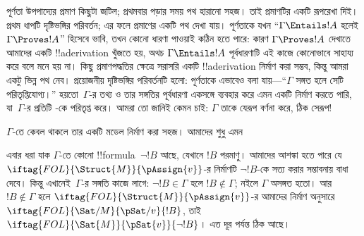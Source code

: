 \documentclass[../../../include/open-logic-section]{subfiles}
\begin{document}
      {}
      {}


পূর্ণতা উপপাদ্যের প্রমাণ কিছুটা জটিল; প্রথমবার পড়ার সময় পথ হারানো সহজ।
তাই প্রমাণটির একটি রূপরেখা দিই। প্রথম ধাপটি দৃষ্টিভঙ্গির পরিবর্তন; এর ফলে
প্রমাণের একটি পথ দেখা যায়। পূর্ণতাকে যখন “$\Gamma \Entails !A$ হলেই
$\Gamma \Proves !A$” হিসেবে ভাবি, তখন কোনো ধারণা পাওয়াই কঠিন হতে পারে:
কারণ $\Gamma \Proves !A$ দেখাতে আমাদের একটি !!a{derivation} খুঁজতে হয়,
অথচ $\Gamma \Entails !A$ পূর্বধারণাটি এই কাজে কোনোভাবে সাহায্য করে বলে
মনে হয় না। কিছু প্রমাণপদ্ধতির ক্ষেত্রে সরাসরি একটি !!a{derivation}
নির্মাণ করা সম্ভব, কিন্তু আমরা একটু ভিন্ন পথ নেব। প্রয়োজনীয় দৃষ্টিভঙ্গির
পরিবর্তনটি হলো: পূর্ণতাকে এভাবেও বলা যায়—“$\Gamma$ সঙ্গত হলে সেটি
পরিতৃপ্তিযোগ্য।” হয়তো~$\Gamma$-র তথ্য ও তার সঙ্গতির পূর্বধারণা একসঙ্গে
ব্যবহার করে এমন একটি  নির্মাণ
করতে পারি, যা~$\Gamma$-র প্রতিটি
-কে পরিতৃপ্ত করে। আমরা তো জানিই
কেমন  চাই: $\Gamma$ তাকে যেরূপ
বর্ণনা করে, ঠিক সেরূপ!{}

$\Gamma$-তে কেবল 
থাকলে তার একটি মডেল নির্মাণ করা সহজ। আমাদের শুধু এমন

এবার ধরা যাক $\Gamma$-তে কোনো !!{formula}~$\lnot !B$ আছে, যেখানে $!B$
পরমাণু। আমাদের আশঙ্কা হতে পারে যে
$\iftag{FOL}{\Struct{M}}{\pAssign{v}}$-র নির্মাণটি $\lnot !B$-কে সত্য
করার সম্ভাবনায় বাধা দেবে। কিন্তু এখানেই~$\Gamma$-র সঙ্গতি কাজে লাগে:
$\lnot !B \in \Gamma$ হলে $!B \notin \Gamma$; নইলে $\Gamma$ অসঙ্গত
হতো। আর $!B \notin \Gamma$ হলে
$\iftag{FOL}{\Struct{M}}{\pAssign{v}}$-র আমাদের নির্মাণ অনুসারে
$\iftag{FOL}{\Sat/{M}}{\pSat/{v}}{!B}$, তাই
$\iftag{FOL}{\Sat{M}}{\pSat{v}}{\lnot !B}$। এত দূর পর্যন্ত ঠিক আছে।
\end{document}

